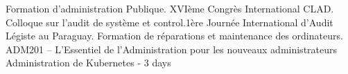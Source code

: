 
\begin{scholarship}
			{Formation d’administration Publique. XVIème Congrès International CLAD.}
			{Colloque sur l’audit de système et control.1ère Journée International d’Audit Légiste au Paraguay.}
			{Formation de réparations et maintenance des ordinateurs.}
			{ADM201 – L’Essentiel de l’Administration pour les nouveaux administrateurs}
			{Administration de Kubernetes - 3 days}
\end{scholarship}
